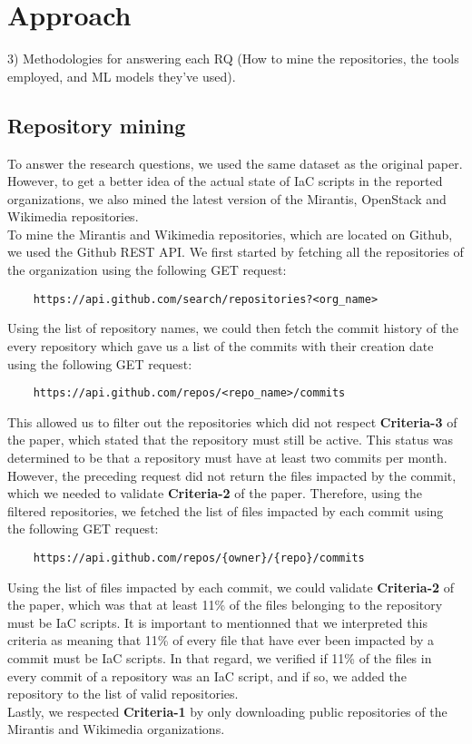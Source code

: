 
\section{Approach}
3) Methodologies for answering each RQ (How to mine the repositories, the tools employed, and ML models they've used).
\subsection{Repository mining}
To answer the research questions, we used the same dataset as the original paper. However, to get a better idea of the actual state of IaC scripts in the reported organizations, we also mined the latest version of the Mirantis, OpenStack and Wikimedia repositories. \\
To mine the Mirantis and Wikimedia repositories, which are located on Github, we used the Github REST API. We first started by fetching all the repositories of the organization using the following GET request:

\begin{verbatim}
    https://api.github.com/search/repositories?<org_name>
\end{verbatim}

Using the list of repository names, we could then fetch the commit history of the every repository which gave us a list of the commits with their creation date using the following GET request:

\begin{verbatim}
    https://api.github.com/repos/<repo_name>/commits
\end{verbatim}

This allowed us to filter out the repositories which did not respect \textbf{Criteria-3} of the paper, which stated that the repository must still be active. This status was determined to be that a repository must have at least two commits per month. \\
However, the preceding request did not return the files impacted by the commit, which we needed to validate \textbf{Criteria-2} of the paper. Therefore, using the filtered repositories, we fetched the list of files impacted by each commit using the following GET request:

\begin{verbatim}
    https://api.github.com/repos/{owner}/{repo}/commits
\end{verbatim}

Using the list of files impacted by each commit, we could validate \textbf{Criteria-2} of the paper, which was that at least 11\% of the files belonging to the repository must be IaC scripts. It is important to mentionned that we interpreted this criteria as meaning that 11\% of every file that have ever been impacted by a commit must be IaC scripts. In that regard, we verified if 11\% of the files in every commit of a repository was an IaC script, and if so, we added the repository to the list of valid repositories. \\
Lastly, we respected \textbf{Criteria-1} by only downloading public repositories of the Mirantis and Wikimedia organizations. \\

